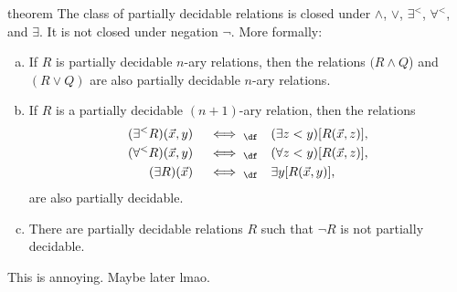 \documentclass[class=article, crop=false]{standalone}
\begin{document}
\begin{result}{theorem}
  The class of partially decidable relations is closed under $\land$, $\lor$, $\exists^<$, $\forall^<$, and $\exists$. It is not closed under negation $\lnot$. More formally:
  \begin{enumerate}[(a)]
    \item If $R$ is partially decidable $n$-ary relations, then the relations $(R \land Q$) and $(R \lor Q)$ are also partially decidable $n$-ary relations.

    \item If $R$ is a partially decidable $(n+1)$-ary relation, then the relations
      \begin{align*}
        (\exists^< R)(\vec x,y) \quad &\iff_\df \quad (\exists z < y) [R(\vec x,z)], \\
        (\forall^< R) (\vec x,y) \quad &\iff_\df \quad (\forall z <y)[R(\vec x,z)], \\
        (\exists R)(\vec x) \quad &\iff_\df \quad \exists y [R(\vec x,y)],
      \end{align*}
    are also partially decidable.

    \item There are partially decidable relations $R$ such that $\lnot R$ is not partially decidable.
  \end{enumerate}
\end{result}
\begin{pf}
  This is annoying. Maybe later lmao.
\end{pf}
\end{document}
